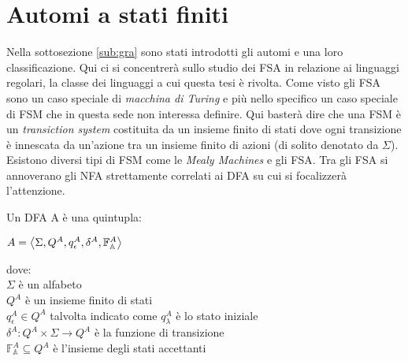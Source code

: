 \section{Automi a stati finiti}
\label{sec:FSA}
Nella sottosezione \ref{sub:gra} sono stati introdotti gli automi e una loro classificazione. Qui ci si concentrerà sullo studio dei \ac{FSA} in relazione ai linguaggi regolari, la classe dei linguaggi a cui questa tesi è rivolta. Come visto gli \ac{FSA} sono un caso speciale di \textit{macchina di Turing} e più nello specifico un caso speciale di \ac{FSM} che in questa sede non interessa definire. Qui basterà dire che   una \ac{FSM} è un \textit{transiction system} costituita da un insieme finito di stati dove ogni transizione è innescata da un'azione tra un insieme finito di azioni (di solito denotato da $\Sigma$). Esistono diversi tipi di \ac{FSM} come le \textit{Mealy Machines} e gli \ac{FSA}. Tra gli \ac{FSA} si annoverano gli \ac{NFA} strettamente correlati ai \ac{DFA} su cui si focalizzerà l'attenzione.
\begin{definizione}
\label{def:dfa}
Un \ac{DFA} A è una quintupla:\\

\centerline{$A = \Braket{\Sigma,Q^{A},q_{\epsilon}^{A},\delta^{A}, \mathbb{F}_{\mathbb{A}}^{A}}$}
\end{definizione}
dove:\\
$\Sigma$ è un alfabeto\\
$Q^{A}$ è un insieme finito di stati\\
$q_{\epsilon}^{A} \in Q^{A}$ talvolta indicato come $q_{\lambda}^{A}$ è lo stato iniziale\\
$\delta^{A} : Q^{A} \times \Sigma \to Q^{A} $ è la funzione di transizione\\
$\mathbb{F}_{\mathbb{A}}^{A} \subseteq Q^{A}$ è l'insieme degli stati accettanti\\

